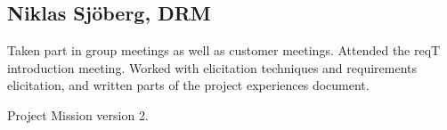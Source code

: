 \documentclass[10pt]{article}
\begin{document}
\subsection{Niklas Sjöberg, DRM}
Taken part in group meetings as well as customer meetings. Attended the reqT introduction meeting. Worked with elicitation techniques and requirements elicitation, and written parts of the project experiences document. 

\begin{thebibliography}{1}
 Project Mission version 2. 

\end{thebibliography}
\end{document}
